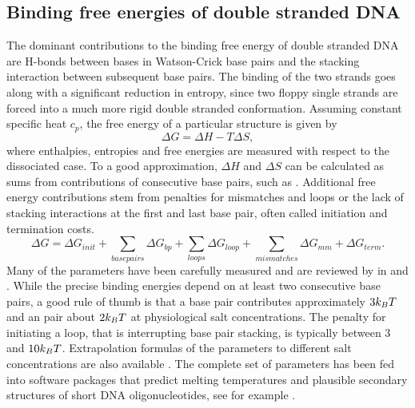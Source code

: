 \subsection{Binding free energies of double stranded DNA}
The dominant contributions to the binding free energy of double stranded DNA are
H-bonds between bases in Watson-Crick base pairs and the stacking
interaction between subsequent base pairs. The binding of the two strands goes along
with a significant reduction in entropy, since two floppy single strands are forced into 
a much more rigid double stranded conformation. 
Assuming constant specific heat $c_p$, the free energy of a particular structure is given 
by
\begin{equation}
\label{eq:DNA_free_energy}
\Delta G = \Delta H -T\Delta S,
\end{equation}
where enthalpies, entropies and free energies are measured with respect to the dissociated
case. To a good approximation, $\Delta H$ and $\Delta S$ can be calculated as sums from 
contributions of consecutive base pairs, such as . Additional free energy contributions 
stem from penalties for mismatches and loops or the lack of stacking interactions at the first and last
base pair, often called initiation  and termination costs.
\begin{equation}
\label{eq:DNA_free_energy}
\Delta G = \Delta G_{init} +\sum_{basepairs} \Delta G_{bp} + \sum_{loops} \Delta G_{loop}+\sum_{mismatches} \Delta G_{mm}+\Delta G_{term}.
\end{equation}
Many of the parameters have been carefully measured and are reviewed by 
\citeauthor{SantaLucia_PNAS_98} in \cite{SantaLucia_PNAS_98} and 
\cite{SantaLucia_AnnRevBioPhys_04}. While the precise binding energies depend on at least two consecutive base pairs, a good
rule of thumb is that a  base pair contributes approximately $3k_BT$ and an  pair
about $2k_BT$ at physiological salt concentrations. The penalty for initiating a loop, that is interrupting base pair stacking, is typically between $3$ and $10k_BT$. 
Extrapolation formulas of the parameters to 
different salt concentrations are also available \cite{SantaLucia_AnnRevBioPhys_04}. The complete set of 
parameters has been fed into software packages that predict melting temperatures and
plausible secondary structures of short DNA oligonucleotides, see for example \cite{Zuker_NAR_03}.

